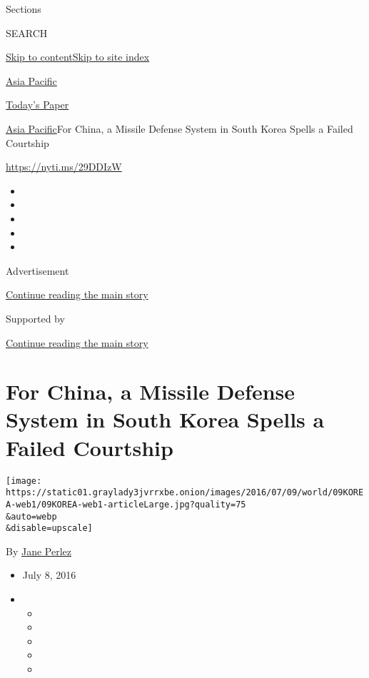 Sections

SEARCH

\protect\hyperlink{site-content}{Skip to
content}\protect\hyperlink{site-index}{Skip to site index}

\href{https://www.nytimes3xbfgragh.onion/section/world/asia}{Asia
Pacific}

\href{https://myaccount.nytimes3xbfgragh.onion/auth/login?response_type=cookie\&client_id=vi}{}

\href{https://www.nytimes3xbfgragh.onion/section/todayspaper}{Today's
Paper}

\href{/section/world/asia}{Asia Pacific}\textbar{}For China, a Missile
Defense System in South Korea Spells a Failed Courtship

\url{https://nyti.ms/29DDIzW}

\begin{itemize}
\item
\item
\item
\item
\item
\end{itemize}

Advertisement

\protect\hyperlink{after-top}{Continue reading the main story}

Supported by

\protect\hyperlink{after-sponsor}{Continue reading the main story}

\hypertarget{for-china-a-missile-defense-system-in-south-korea-spells-a-failed-courtship}{%
\section{For China, a Missile Defense System in South Korea Spells a
Failed
Courtship}\label{for-china-a-missile-defense-system-in-south-korea-spells-a-failed-courtship}}

\texttt{[image: https://static01.graylady3jvrrxbe.onion/images/2016/07/09/world/09KOREA-web1/09KOREA-web1-articleLarge.jpg?quality=75\\\&auto=webp\\\&disable=upscale]}

By \href{http://www.nytimes3xbfgragh.onion/by/jane-perlez}{Jane Perlez}

\begin{itemize}
\item
  July 8, 2016
\item
  \begin{itemize}
  \item
  \item
  \item
  \item
  \item
  \end{itemize}
\end{itemize}

